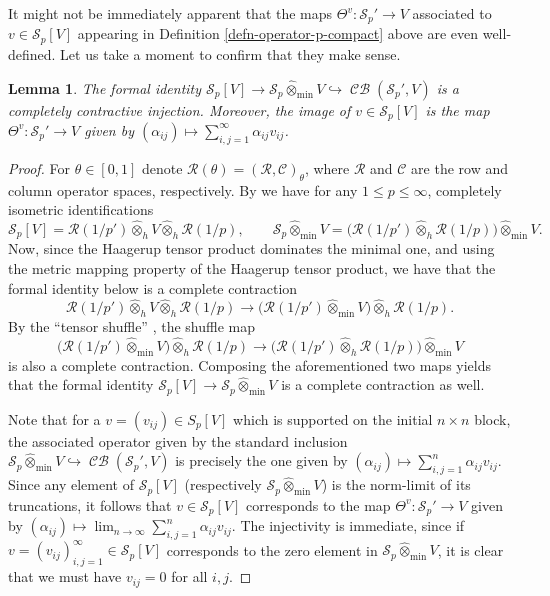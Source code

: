 \documentclass[11pt]{amsart}
\DeclareMathOperator{\CB}{\mathcal{CB}}
\newtheorem{lemma}[theorem]{Lemma}
\numberwithin{equation}{section}
\begin{document}
It might not be immediately apparent that the maps $\Theta^v : \mathcal{S}_p' \to V$ associated to $v\in \mathcal{S}_p[V]$ appearing in Definition \ref{defn-operator-p-compact} above are even well-defined. Let us take a moment to confirm that they make sense.


\begin{lemma}\label{lemma-Theta-well-defined}
The formal identity $\mathcal{S}_p[V] \to \mathcal{S}_p\widehat\otimes_{\min} V \hookrightarrow \CB(\mathcal{S}_p',V)$ is a completely contractive injection. Moreover, the image of $v \in \mathcal{S}_p[V]$ is the map $\Theta^v : \mathcal{S}_p' \to V$ given by $(\alpha_{ij}) \mapsto \sum_{i,j=1}^{\infty} \alpha_{ij} v_{ij}$.
\end{lemma}

\begin{proof}
For $\theta \in  [0,1]$ denote $\mathcal{R}(\theta) = ( \mathcal{R}, \mathcal{C} )_\theta$, where $\mathcal{R}$ and $\mathcal{C}$ are the row and column operator spaces, respectively.
By \cite[Thm. 1.1]{Pisier-Asterisque} we have for any $1\le p\le \infty$, completely isometric identifications
\[
\mathcal{S}_p[V] = \mathcal{R}(1/p') \widehat\otimes_h V \widehat\otimes_h \mathcal{R}(1/p), \qquad \mathcal{S}_p\widehat\otimes_{\min} V = \big( \mathcal{R}(1/p')\widehat\otimes_h \mathcal{R}(1/p)  \big) \widehat\otimes_{\min} V.
\]
Now, since the Haagerup tensor product dominates the minimal one, and using the metric mapping property of the Haagerup tensor product, we have that the formal identity below is a complete contraction
\[
\mathcal{R}(1/p') \widehat\otimes_h V \widehat\otimes_h \mathcal{R}(1/p) \to \big( \mathcal{R}(1/p') \widehat\otimes_{\min} V \big)  \widehat\otimes_h \mathcal{R}(1/p).
\]
By the ``tensor shuffle'' \cite[Thm. 5.15]{Pisier-OS-theory}, the shuffle map
\[
\big( \mathcal{R}(1/p') \widehat\otimes_{\min} V \big)  \widehat\otimes_h \mathcal{R}(1/p) \to \big( \mathcal{R}(1/p')\widehat\otimes_h \mathcal{R}(1/p)  \big) \widehat\otimes_{\min} V
\]
is also a complete contraction.
Composing the aforementioned two maps yields that the formal identity $\mathcal{S}_p[V] \to \mathcal{S}_p\widehat\otimes_{\min} V$ is a complete contraction as well.


Note that for a $v=(v_{ij}) \in S_p[V]$ which is supported on the initial $n \times n$ block, the associated operator given by the standard inclusion $\mathcal{S}_p\widehat\otimes_{\min} V \hookrightarrow \CB(\mathcal{S}_p',V)$ is precisely the one given by $(\alpha_{ij}) \mapsto \sum_{i,j=1}^n \alpha_{ij} v_{ij}$.
Since any element of $\mathcal{S}_p[V]$ (respectively $\mathcal{S}_p\widehat\otimes_{\min} V$) is the norm-limit of its truncations, it follows that $v \in \mathcal{S}_p[V]$ corresponds to the map $\Theta^v : \mathcal{S}_p' \to V$ given by $(\alpha_{ij}) \mapsto \lim_{n\to\infty} \sum_{i,j=1}^{n} \alpha_{ij} v_{ij}$.
The injectivity is immediate, since if $v = (v_{ij})_{i,j=1}^\infty \in \mathcal{S}_p[V]$ corresponds to the zero element in $\mathcal{S}_p\widehat\otimes_{\min} V$, it is clear that we must have $v_{ij}=0$ for all $i,j$.
\end{proof}
\end{document}
